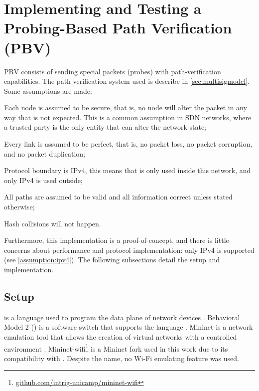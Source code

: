 
\section{Implementing and Testing a Probing-Based Path Verification (PBV)}

PBV consists of sending special packets (probes) with path-verification capabilities. The path verification system used is describe in \autoref{sec:multisigmodel}. Some assumptions are made:
\begin{inlinelist}
    \item Each node is assumed to be secure, that is, no node will alter the packet in any way that is not expected. This is a common assumption in SDN networks, where a trusted party is the only entity that can alter the network state;
    \item  Every link is assumed to be perfect, that is, no packet loss, no packet corruption, and no packet duplication;
    \item  Protocol boundary is IPv4, this means that 
    \pathsec is only used inside this network, and only IPv4 is used outside; \label{assumption:ipv4}
    \item All paths are assumed to be valid and all information correct unless stated otherwise;
    \item Hash collisions will not happen.
\end{inlinelist}
Furthermore, this implementation is a proof-of-concept, and there is little concerns about performance and protocol implementation: only IPv4 is supported (see \autoref{assumption:ipv4}). The following subsections detail the setup and implementation.

\subsection{Setup}

\pIV is a language used to program the data plane of network devices \cite{p4}. Behavioral Model 2 (\bmv) is a software switch that supports the \pIV language \cite{bmv2}. Mininet is a network emulation tool that allows the creation of virtual networks with a controlled environment \cite{mininet}. Mininet-wifi\footnote{\url{github.com/intrig-unicamp/mininet-wifi}} is a Mininet fork used in this work due to its compatibility with \bmv. Despite the name, no Wi-Fi emulating feature was used.

